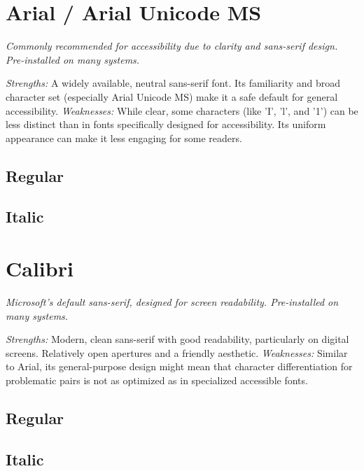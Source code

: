 \begin{raggedright}
\pagebreak
\section{Arial / Arial Unicode MS}\label{sec:arial}
\emph{Commonly recommended for accessibility due to clarity and sans-serif design. Pre-installed on many systems.}
\begin{raggedright}
\emph{Strengths:} A widely available, neutral sans-serif font. Its familiarity and broad character set (especially Arial Unicode MS) make it a safe default for general accessibility.
\emph{Weaknesses:} While clear, some characters (like 'I', 'l', and '1') can be less distinct than in fonts specifically designed for accessibility. Its uniform appearance can make it less engaging for some readers.

\subsection{Regular}
\FontSample{\arialfont}

\subsection{Italic}
\FontSample{{\arialfont\itshape}}
\end{raggedright}


\pagebreak
\section{Calibri}\label{sec:calibri}
\emph{Microsoft’s default sans-serif, designed for screen readability. Pre-installed on many systems.}
\begin{raggedright}
\emph{Strengths:} Modern, clean sans-serif with good readability, particularly on digital screens. Relatively open apertures and a friendly aesthetic.
\emph{Weaknesses:} Similar to Arial, its general-purpose design might mean that character differentiation for problematic pairs is not as optimized as in specialized accessible fonts.

\subsection{Regular}
\FontSample{\calibrifont}

\subsection{Italic}
\FontSample{{\calibrifont\itshape}}
\end{raggedright}



\end{raggedright}
